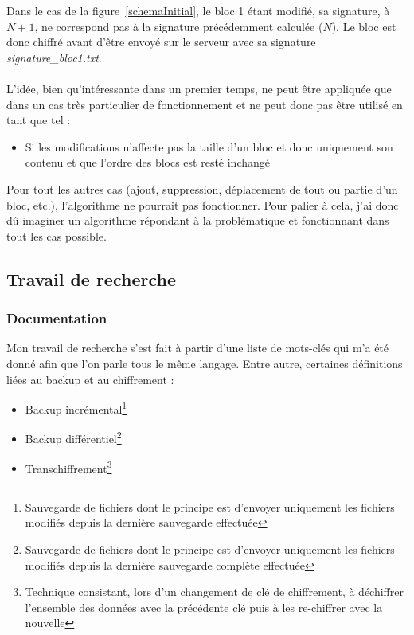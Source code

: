 \documentclass[a4paper,10pt, twoside]{report}
\begin{document}
\begin{spacing}{1.2}
Dans le cas de la figure~\ref{schemaInitial}, le bloc 1 \'etant modifi\'e, sa
signature, \`a \(N + 1\), ne correspond pas \`a la signature pr\'ec\'edemment
calcul\'ee (\(N\)). Le bloc est donc chiffr\'e avant d'\^etre envoy\'e sur le
serveur avec sa signature \textit{signature\_bloc1.txt}.

\paragraph{}
L'id\'ee, bien qu'int\'eressante dans un premier temps, ne peut \^etre
appliqu\'ee que dans un cas tr\`es particulier de fonctionnement et ne peut
donc pas \^etre utilis\'e en tant que tel :
\begin{itemize}
 \item Si les modifications n'affecte pas la taille d'un bloc et donc
 uniquement son contenu et que l'ordre des blocs est rest\'e inchang\'e
\end{itemize}

Pour tout les autres cas (ajout, suppression, d\'eplacement de tout ou partie
d'un bloc, etc.), l'algorithme ne pourrait pas fonctionner. Pour palier \`a
cela, j'ai donc d\^u imaginer un algorithme r\'epondant \`a la probl\'ematique
et fonctionnant dans tout les cas possible.

\subsection{Travail de recherche}
\subsubsection{Documentation}
Mon travail de recherche s'est fait \`a partir d'une liste de mots-cl\'es qui
m'a \'et\'e donn\'e afin que l'on parle tous le m\^eme langage. Entre autre,
certaines d\'efinitions li\'ees au backup et au chiffrement :
\begin{itemize}
 \item Backup incr\'emental\footnote{Sauvegarde de fichiers dont le principe est
 d'envoyer uniquement les fichiers modifi\'es depuis la derni\`ere sauvegarde
 effectu\'ee}
 \item Backup diff\'erentiel\footnote{Sauvegarde de fichiers dont le principe
 est d'envoyer uniquement les fichiers modifi\'es depuis la derni\`ere
 sauvegarde compl\`ete effectu\'ee}
 \item Transchiffrement\footnote{Technique consistant, lors d'un changement
 de cl\'e de chiffrement, \`a d\'echiffrer l'ensemble des donn\'ees avec la
 pr\'ec\'edente cl\'e puis \`a les re-chiffrer avec la nouvelle}
\end{itemize}


\end{spacing}
\end{document}
